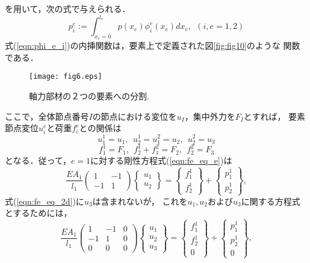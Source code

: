 \documentclass[10pt,a4j]{jarticle}
\begin{document}
を用いて，次の式で与えられる．
\begin{equation}
	p^e_i:=\int_{x_e=0}^{l_e}p(x_e)\phi^e_i(x_e)dx_e, \ \ (i,e=1,2)
\end{equation}
式(\ref{eqn:phi_e_i})の内挿関数は，要素上で定義された図\ref{fig:fig10}のような
関数である．\\
\begin{figure}[h]
	\begin{center}
	\texttt{[image: fig6.eps]} 
	\end{center}
	\caption{軸力部材の２つの要素への分割.} 
	\label{fig:fig6}
\end{figure}

ここで，全体節点番号$I$の節点における変位を$u_I$，集中外力を$F_I$とすれば，
要素節点変位$u^e_i$と荷重$f^e_i$との関係は
\begin{equation}
	u^1_1=u_1, \ \ u^1_2=u^2_1=u_2, \ \ u^2_2=u_3
	\label{eqn:ui2uI}
\end{equation}
\begin{equation}
	f^1_1=F_1, \ \ f^1_2+f^2_1=F_2, \ \ f^2_2=F_3
	\label{eqn:fi2FI}
\end{equation}
となる．従って，$e=1$に対する剛性方程式(\ref{eqn:fe_eq_e})は
\begin{equation}
	\frac{EA_1}{l_1}
	\left(
	\begin{array}{cc}
		1 & -1  \\
		-1 & 1 
	\end{array}
	\right)
	\left\{
	\begin{array}{c}
		u_1 \\
		u_2 
	\end{array}
	\right\}
	=
	\left\{
	\begin{array}{c}
		f^1_1  \\
		f^1_2 
	\end{array}
	\right\}
	+
	\left\{
	\begin{array}{c}
		p^1_1 \\
		p^1_2 
	\end{array}
	\right\}, 
	\label{eqn:fe_eq_1_2d}
\end{equation}
式(\ref{eqn:fe_eq_2d})に$u_3$は含まれないが，
これを$u_1,u_2$および$u_3$に関する方程式とするためには，
\begin{equation}
	\frac{EA_1}{l_1}
	\left(
	\begin{array}{ccc}
		1 & -1 & 0 \\
		-1 & 1  & 0 \\
		0 & 0  & 0 
	\end{array}
	\right)
	\left\{
	\begin{array}{c}
		u_1 \\
		u_2 \\
		u_3
	\end{array}
	\right\}
	=
	\left\{
	\begin{array}{c}
		f^1_1  \\
		f^1_2  \\
		0
	\end{array}
	\right\}
	+
	\left\{
	\begin{array}{c}
		p^1_1 \\
		p^1_2 \\
		0
	\end{array}
	\right\}, 
	\label{eqn:fe_eq_1}
\end{equation}
\end{document}
